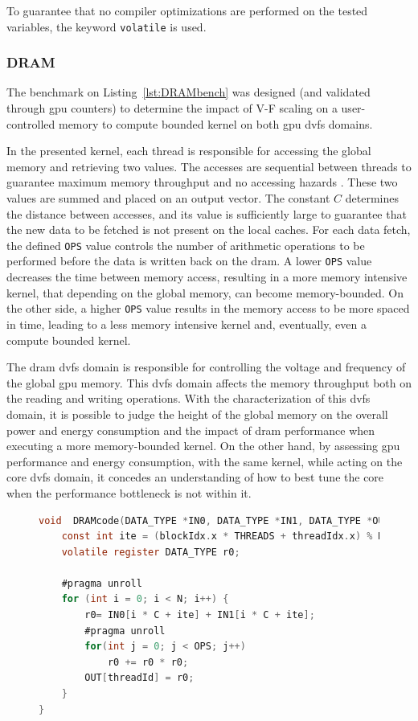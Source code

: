 To guarantee that no compiler optimizations are performed on the tested variables, the keyword \texttt{volatile} is used.


\subsubsection{DRAM}

The benchmark on Listing~\ref{lst:DRAMbench} was designed (and validated through \acrshort{gpu} counters) to determine the impact of V-F scaling on a user-controlled memory to compute bounded kernel on both \acrshort{gpu} \acrshort{dvfs} domains. 

In the presented kernel, each thread is responsible for accessing the global memory and retrieving two values. The accesses are sequential between threads to guarantee maximum memory throughput and no accessing hazards
. These two values are summed and placed on an output vector. The constant $C$ determines the distance between accesses, and its value is sufficiently large to guarantee that the new data to be fetched is not present on the local caches.
For each data fetch, the defined \texttt{OPS} value controls the number of arithmetic operations to be performed before the data is written back on the \acrshort{dram}. A lower \texttt{OPS} value decreases the time between memory access, resulting in a more memory intensive kernel, that depending on the global memory, can become memory-bounded. On the other side, a higher \texttt{OPS} value results in the memory access to be more spaced in time, leading to a less memory intensive kernel and, eventually, even a compute bounded kernel.

The \acrshort{dram} \acrshort{dvfs} domain is responsible for controlling the voltage and frequency of the global \acrshort{gpu} memory. This \acrshort{dvfs} domain affects the memory throughput both on the reading and writing operations. With the characterization of this \acrshort{dvfs} domain, it is possible to judge the height of the global memory on the overall power and energy consumption and the impact of \acrshort{dram} performance when executing a more memory-bounded kernel. On the other hand, by assessing \acrshort{gpu} performance and energy consumption, with the same kernel, while acting on the core \acrshort{dvfs} domain, it concedes an understanding of how to best tune the core when the performance bottleneck is not within it.

\begin{figure}[h]
\begin{lstlisting}[language=C, caption=DRAM Benchmark Code, label=lst:DRAMbench, basicstyle=\footnotesize\ttfamily,abovecaptionskip=0pt, captionpos=b]
void  DRAMcode(DATA_TYPE *IN0, DATA_TYPE *IN1, DATA_TYPE *OUT) {
    const int ite = (blockIdx.x * THREADS + threadIdx.x) % MEM_BLOCK;
    volatile register DATA_TYPE r0;
    
    #pragma unroll
    for (int i = 0; i < N; i++) {
        r0= IN0[i * C + ite] + IN1[i * C + ite];
        #pragma unroll
        for(int j = 0; j < OPS; j++)  
            r0 += r0 * r0;
        OUT[threadId] = r0;
    }
}
\end{lstlisting}
\end{figure}

